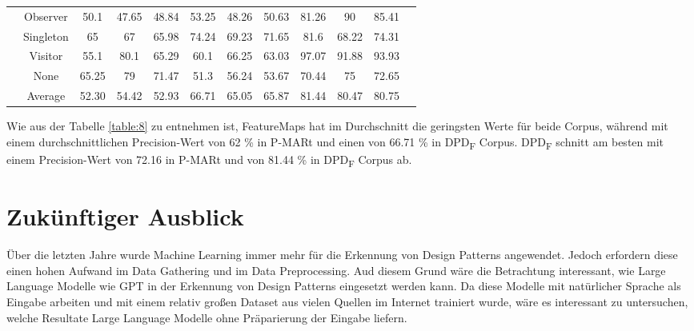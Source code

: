 \documentclass[conference]{IEEEtran}
\begin{document}
\begin{table}
\begin{tabular}{|c|c|c|c|c|c|c|c|c|c|c|c|}
                                                     & Observer         & 50.1                              & 47.65                            & 48.84                                      & 53.25  & 48.26  & 50.63     & 81.26  & 90     & 85.41     \\
                                                     & Singleton        & 65                                & 67                               & 65.98                                      & 74.24  & 69.23  & 71.65     & 81.6   & 68.22  & 74.31     \\
                                                     & Visitor          & 55.1                              & 80.1                             & 65.29                                      & 60.1   & 66.25  & 63.03     & 97.07  & 91.88  & 93.93     \\
                                                     & None             & 65.25                             & 79                               & 71.47                                      & 51.3   & 56.24  & 53.67     & 70.44  & 75     & 72.65     \\
        \cline{2-11}
                                                     & Average          & 52.30                             & 54.42                            & 52.93                                      & 66.71  & 65.05  & 65.87     & 81.44  & 80.47  & 80.75     \\
        \hline
    \end{tabular}
\end{table}

\newpage

Wie aus der Tabelle \ref{table:8} zu entnehmen ist, FeatureMaps hat im Durchschnitt die geringsten Werte für beide Corpus, während mit einem durchschnittlichen Precision-Wert von 62 \% in P-MARt und einen von 66.71 \% in DPD\textsubscript{F} Corpus.
DPD\textsubscript{F} schnitt am besten mit einem Precision-Wert von 72.16 in P-MARt und von 81.44 \% in DPD\textsubscript{F} Corpus ab.

\newpage

\section{Zukünftiger Ausblick}

Über die letzten Jahre wurde Machine Learning immer mehr für die Erkennung von Design Patterns angewendet. Jedoch erfordern diese einen hohen Aufwand im Data Gathering und im Data Preprocessing.
Aud diesem Grund wäre die Betrachtung interessant, wie Large Language Modelle wie GPT in der Erkennung von Design Patterns eingesetzt werden kann. Da diese Modelle mit natürlicher Sprache als Eingabe arbeiten und mit einem relativ großen Dataset aus vielen Quellen im Internet trainiert wurde,
wäre es interessant zu untersuchen, welche Resultate Large Language Modelle ohne Präparierung der Eingabe liefern.

\newpage


\end{document}
